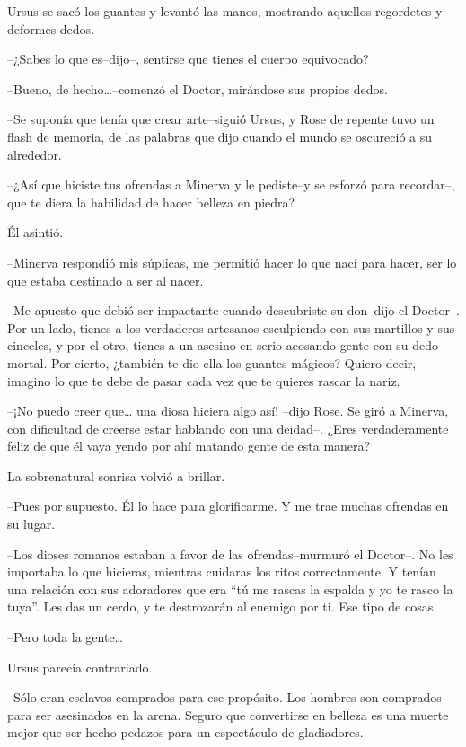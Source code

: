 Ursus se sacó los guantes y levantó las manos, mostrando aquellos
regordetes y deformes dedos.

--¿Sabes lo que es--dijo--, sentirse que tienes el cuerpo equivocado?

--Bueno, de hecho\ldots{}--comenzó el Doctor, mirándose sus propios
dedos.

--Se suponía que tenía que crear arte--siguió Ursus, y Rose de repente
tuvo un flash de memoria, de las palabras que dijo cuando el mundo se
oscureció a su alrededor.

--¿Así que hiciste tus ofrendas a Minerva y le pediste--y se esforzó
para recordar--, que te diera la habilidad de hacer belleza en piedra?

Él asintió.

--Minerva respondió mis súplicas, me permitió hacer lo que nací para
hacer, ser lo que estaba destinado a ser al nacer.

--Me apuesto que debió ser impactante cuando descubriste su don--dijo el
Doctor--. Por un lado, tienes a los verdaderos artesanos esculpiendo con
sus martillos y sus cinceles, y por el otro, tienes a un asesino en
serio acosando gente con su dedo mortal. Por cierto, ¿también te dio
ella los guantes mágicos? Quiero decir, imagino lo que te debe de pasar
cada vez que te quieres rascar la nariz.

--¡No puedo creer que\ldots{} una diosa hiciera algo así! --dijo Rose.
Se giró a Minerva, con dificultad de creerse estar hablando con una
deidad--. ¿Eres verdaderamente feliz de que él vaya yendo por ahí
matando gente de esta manera?

La sobrenatural sonrisa volvió a brillar.

--Pues por supuesto. Él lo hace para glorificarme. Y me trae muchas
ofrendas en su lugar.

--Los dioses romanos estaban a favor de las ofrendas--murmuró el
Doctor--. No les importaba lo que hicieras, mientras cuidaras los ritos
correctamente. Y tenían una relación con sus adoradores que era ``tú me
rascas la espalda y yo te rasco la tuya''. Les das un cerdo, y te
destrozarán al enemigo por ti. Ese tipo de cosas.

--Pero toda la gente\ldots{}

Ursus parecía contrariado.

--Sólo eran esclavos comprados para ese propósito. Los hombres son
comprados para ser asesinados en la arena. Seguro que convertirse en
belleza es una muerte mejor que ser hecho pedazos para un espectáculo de
gladiadores.


